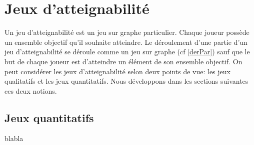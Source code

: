 
\section{Jeux d'atteignabilité}

Un jeu d'atteignabilité est un jeu sur graphe particulier. Chaque joueur possède un ensemble objectif qu'il souhaite atteindre. Le déroulement d'une partie d'un jeu d'atteignabilité se déroule comme un jeu sur graphe (cf \ref{derPar}) sauf que le but de chaque joueur est d'atteindre un élément de son ensemble objectif. On peut considérer les jeux d'atteignabilité selon deux points de vue: les jeux qualitatifs et les jeux quantitatifs. Nous développons dans les sections suivantes ces deux notions.





		
		
\subsection{Jeux quantitatifs }
	blabla
